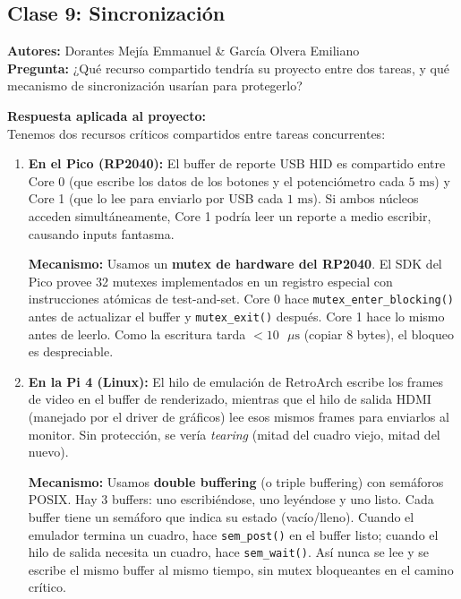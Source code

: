 \documentclass[conference]{IEEEtran}
\begin{document}
\subsection{Clase 9: Sincronización}
\textbf{Autores:} Dorantes Mejía Emmanuel \& García Olvera Emiliano \\
\textbf{Pregunta:} ¿Qué recurso compartido tendría su proyecto entre dos tareas, y qué mecanismo de sincronización usarían para protegerlo?

\textbf{Respuesta aplicada al proyecto:} \\
Tenemos dos recursos críticos compartidos entre tareas concurrentes:

\begin{enumerate}
	\item \textbf{En el Pico (RP2040):} El buffer de reporte USB HID es compartido entre Core 0 (que escribe los datos de los botones y el potenciómetro cada $5\text{ ms}$) y Core 1 (que lo lee para enviarlo por USB cada $1\text{ ms}$). Si ambos núcleos acceden simultáneamente, Core 1 podría leer un reporte a medio escribir, causando inputs fantasma.

	      \textbf{Mecanismo:} Usamos un \textbf{mutex de hardware del RP2040}. El SDK del Pico provee 32 mutexes implementados en un registro especial con instrucciones atómicas de test-and-set. Core 0 hace \texttt{mutex\_enter\_blocking()} antes de actualizar el buffer y \texttt{mutex\_exit()} después. Core 1 hace lo mismo antes de leerlo. Como la escritura tarda $< 10\text{ }\mu\text{s}$ (copiar 8 bytes), el bloqueo es despreciable.

	\item \textbf{En la Pi 4 (Linux):} El hilo de emulación de RetroArch escribe los frames de video en el buffer de renderizado, mientras que el hilo de salida HDMI (manejado por el driver de gráficos) lee esos mismos frames para enviarlos al monitor. Sin protección, se vería \textit{tearing} (mitad del cuadro viejo, mitad del nuevo).

	      \textbf{Mecanismo:} Usamos \textbf{double buffering} (o triple buffering) con semáforos POSIX. Hay 3 buffers: uno escribiéndose, uno leyéndose y uno listo. Cada buffer tiene un semáforo que indica su estado (vacío/lleno). Cuando el emulador termina un cuadro, hace \texttt{sem\_post()} en el buffer listo; cuando el hilo de salida necesita un cuadro, hace \texttt{sem\_wait()}. Así nunca se lee y se escribe el mismo buffer al mismo tiempo, sin mutex bloqueantes en el camino crítico.
\end{enumerate}
\end{document}
